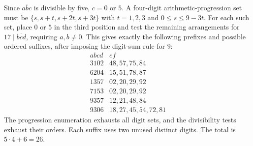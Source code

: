 Since $\overline{abc}$ is divisible by five, $c=0$ or $5$. A four-digit arithmetic-progression set must be $\{s,s+t,s+2t,s+3t\}$ with $t=1,2,3$ and $0\le s\le9-3t$. For each such set, place $0$ or $5$ in the third position and test the remaining arrangements for $17\mid\overline{bcd}$, requiring $a,b\ne0$. This gives exactly the following prefixes and possible ordered suffixes, after imposing the digit-sum rule for $9$:
\[\begin{array}{c|l}abcd&ef\\\hline3102&48,57,75,84\\6204&15,51,78,87\\1357&02,20,29,92\\7153&02,20,29,92\\9357&12,21,48,84\\9306&18,27,45,54,72,81\end{array}\]
The progression enumeration exhausts all digit sets, and the divisibility tests exhaust their orders. Each suffix uses two unused distinct digits. The total is $5\cdot4+6=\boxed{26}$.
